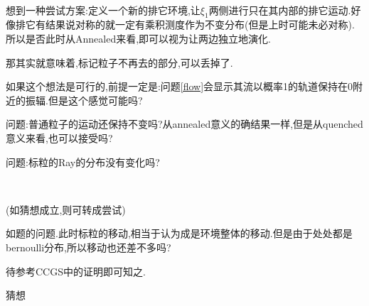 \documentclass[a4paper,oneside]{ctexbook}
\begin{document}
					\begin{tri}[拆成两部分不相关的排它环境]
						\label{separate}
						\ 

						想到一种尝试方案:定义一个新的排它环境,让$\xi_1$两侧进行只在其内部的排它运动.好像排它有结果说对称的就一定有乘积测度作为不变分布(但是上时可能未必对称).所以是否此时从Annealed来看,即可以视为让两边独立地演化.

						那其实就意味着,标记粒子不再去的部分,可以丢掉了.

						如果这个想法是可行的,前提一定是:问题\ref{flow}会显示其流以概率1的轨道保持在0附近的振辐.但是这个感觉可能吗?

						问题:普通粒子的运动还保持不变吗?从annealed意义的确结果一样,但是从quenched意义来看,也可以接受吗?

						问题:标粒的Ray的分布没有变化吗?
					\end{tri}

					\begin{conjec}
						\label{free tagged}
						\ 

						(如猜想成立,则可转成尝试)

						如题的问题.此时标粒的移动,相当于认为成是环境整体的移动.但是由于处处都是bernoulli分布,所以移动也还差不多吗?

						待参考CCGS中的证明即可知之.

						猜想
					\end{conjec}
\end{document}
